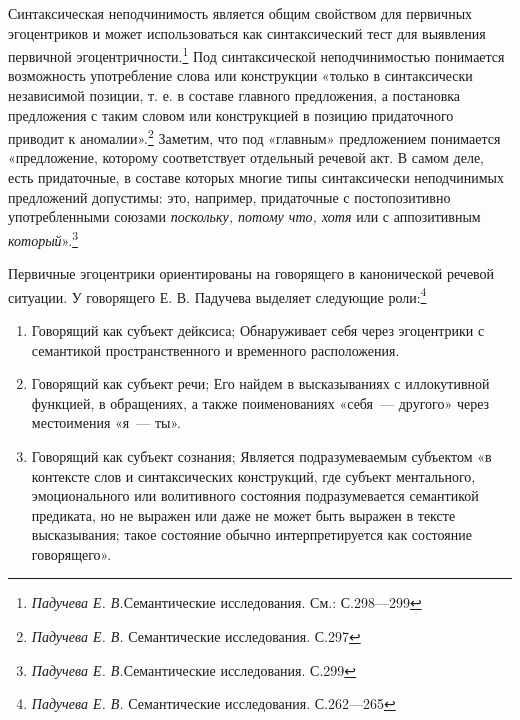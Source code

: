 \documentclass{kursa4}
\begin{document}
{      Синтаксическая неподчинимость является общим свойством для первичных
      эгоцентриков и может использоваться как синтаксический тест для
      выявления первичной
      эгоцентричности.\footnote{\textit{Падучева Е. В.}Семантические исследования. См.: С.298—299} Под синтаксической неподчинимостью понимается возможность употребление слова или
      конструкции «только в синтаксически независимой позиции, т. е. в
      составе главного предложения, а постановка предложения с таким словом
      или конструкцией в позицию придаточного приводит к
      аномалии».\footnote{\textit{ Падучева Е. В.
      }Семантические исследования. С.297} Заметим, что под «главным»
      предложением понимается «предложение, которому соответствует отдельный
      речевой акт. В самом деле, есть придаточные, в составе которых многие
      типы синтаксически неподчинимых предложений допустимы: это, например,
      придаточные с постопозитивно употребленными союзами \textit{поскольку,
      потому что, хотя} или с аппозитивным
      \textit{который}».\footnote{\textit{Падучева Е. В.}Семантические исследования. С.299}

      Первичные эгоцентрики ориентированы на говорящего в канонической
      речевой ситуации. У говорящего Е. В. Падучева выделяет следующие
      роли:\footnote{\textit{Падучева Е. В.} Семантические исследования. С.262—265}

      \begin{enumerate}

        \item Говорящий как субъект дейксиса; \newline
        Обнаруживает себя через эгоцентрики с семантикой пространственного и
        временного расположения. 

        \item Говорящий как субъект речи; \newline
        Его найдем в высказываниях с иллокутивной функцией, в обращениях, а
        также поименованиях «себя~--- другого» через местоимения «я~--- ты».

        \item Говорящий как субъект сознания; \newline
        Является подразумеваемым субъектом «в контексте слов и синтаксических
        конструкций, где субъект ментального, эмоционального или волитивного
        состояния подразумевается семантикой предиката, но не выражен или даже
        не может быть выражен в тексте высказывания; такое состояние обычно
        интерпретируется как состояние говорящего». 


\end{enumerate}}
\end{document}
